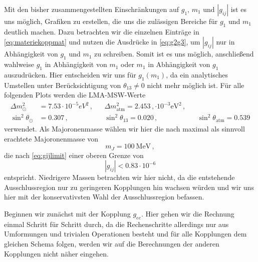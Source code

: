 Mit den bisher zusammengestellten Einschränkungen auf $g_1$, $m_1$ und $|g_{i j}|$ ist es uns möglich, Grafiken zu erstellen, die uns die zulässigen Bereiche für $g_1$ und $m_1$ deutlich machen.
Dazu betrachten wir die einzelnen Einträge in \eqref{eq:materiekoppmat} und nutzen die Ausdrücke in \eqref{eq:g2g3}, um $|g_{i j}|$ nur in Abhängigkeit von $g_1$ und $m_1$ zu schreiben.
Somit ist es uns möglich, anschließend wahlweise $g_1$ in Abhängigkeit von $m_1$ oder $m_1$ in Abhängigkeit von $g_1$ auszudrücken.
Hier entscheiden wir uns für $g_1 (m_1)$, da ein analytisches Umstellen unter Berücksichtigung von $\theta_{1 3} \neq 0$ nicht mehr möglich ist.
Für alle folgenden Plots werden die LMA-MSW-Werte
\begin{align}
    \Delta m^2_\odot   &= \num{7.53} \cdot 10^{-5} \si{eV}^2\,, && \Delta m^2_\text{atm} = \num{2.453}\,, \cdot 10^{-3} \si{\eV}^2\,, \\ 
    \sin^2\theta_\odot &= \num{0.307}                       \,, && \sin^2\theta_{13}     = \num{0.020}\,, && \sin^2\theta_\text{atm} = \num{0.539}
    \label{eq:LMAMSW}
\end{align}
verwendet.
Als Majoronenmasse wählen wir hier die nach \cite{neutrinospdg, newlimit}  maximal als sinnvoll erachtete Majoronenmasse von 
\begin{equation*}
    m_J = \SI{100}{\mega\eV} \,,
\end{equation*}
die nach \eqref{eq:gijlimit} einer oberen Grenze von
\begin{equation*}
    |g_{ij}| < \num{0.83} \cdot 10^{-6}
\end{equation*}
entspricht.
Niedrigere Massen betrachten wir hier nicht, da die entstehende Ausschlussregion nur zu geringeren Kopplungen hin wachsen würden und wir uns hier mit der konservativsten Wahl der Ausschlussregion befassen.

Beginnen wir zunächst mit der Kopplung $g_{ee}$.
Hier gehen wir die Rechnung einmal Schritt für Schritt durch, da die Rechenschritte allerdings nur aus Umformungen und trivialen Operationen besteht und für alle Kopplungen dem gleichen Schema folgen, werden wir auf die Berechnungen der anderen
Kopplungen nicht näher eingehen.


